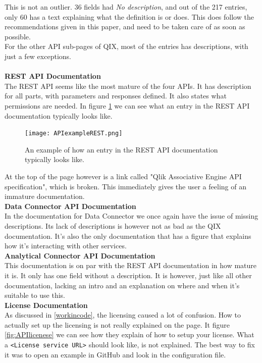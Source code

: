 \documentclass{cslthse-msc}
\begin{document}
    This is not an outlier. 36 fields had \textit{No description}, and out of the 217 entries, only 60 has a text explaining what the definition is or does. This does  follow the recommendations given in this paper, and need to be taken care of as soon as possible.\\
    For the other API sub-pages of QIX, most of the entries has descriptions, with just a few exceptions.\\ \\
    \textbf{REST API Documentation}\\
    The REST API seems like the most mature of the four APIs. It has description for all parts, with parameters and responses defined. It also states what permissions are needed. In figure \ref{fig:RESTmethod} we can see what an entry in the REST API documentation typically looks like.
    \begin{figure}[H]
        \centering
        \texttt{[image: APIexampleREST.png]}
        \caption{An example of how an entry in the REST API documentation typically looks like.}
        \label{fig:RESTmethod}
    \end{figure}
    At the top of the page however is a link called "Qlik Associative Engine API specification", which is broken. This immediately gives the user a feeling of an immature documentation.
    \\
    \textbf{Data Connector API Documentation}\\
    In the documentation for Data Connector we once again have the issue of missing descriptions. Its lack of descriptions is however not as bad as the QIX documentation. It's also the only documentation that has a figure that explains how it's interacting with other services.\\
    \textbf{Analytical Connector API Documentation}\\
    This documentation is on par with the REST API documentation in how mature it is. It only has one field without a description. It is however, just like all other documentation, lacking an intro and an explanation on where and when it's suitable to use this.\\
    \textbf{License Documentation} \\
    As discussed in \ref{workincode}, the licensing caused a lot of confusion. How to actually set up the licensing is not really explained on the page. It figure \ref{fig:APIlicenese} we can see how they explain of how to setup your license. What a \texttt{<License service URL>} should look like, is not explained. The best way to fix it was to open an example in GitHub and look in the configuration file.\\
\end{document}
